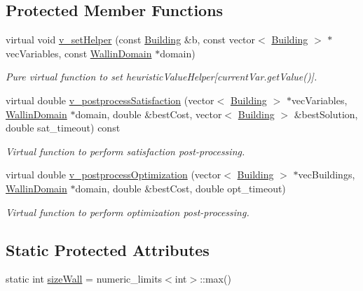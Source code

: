\subsection*{Protected Member Functions}
\begin{DoxyCompactItemize}
\item 
virtual void \hyperlink{classghost_1_1WallinObjective_abc0f66adeebca9f9787a4ae348219fb8}{v\-\_\-set\-Helper} (const \hyperlink{classghost_1_1Building}{Building} \&b, const vector$<$ \hyperlink{classghost_1_1Building}{Building} $>$ $\ast$vec\-Variables, const \hyperlink{classghost_1_1WallinDomain}{Wallin\-Domain} $\ast$domain)
\begin{DoxyCompactList}\small\item\em Pure virtual function to set heuristic\-Value\-Helper\mbox{[}current\-Var.\-get\-Value()\mbox{]}. \end{DoxyCompactList}\item 
virtual double \hyperlink{classghost_1_1WallinObjective_abf3e5873e61f7878e9c31a45642d1544}{v\-\_\-postprocess\-Satisfaction} (vector$<$ \hyperlink{classghost_1_1Building}{Building} $>$ $\ast$vec\-Variables, \hyperlink{classghost_1_1WallinDomain}{Wallin\-Domain} $\ast$domain, double \&best\-Cost, vector$<$ \hyperlink{classghost_1_1Building}{Building} $>$ \&best\-Solution, double sat\-\_\-timeout) const 
\begin{DoxyCompactList}\small\item\em Virtual function to perform satisfaction post-\/processing. \end{DoxyCompactList}\item 
virtual double \hyperlink{classghost_1_1WallinObjective_a646246ffb22f8b915f2d24c9439426fd}{v\-\_\-postprocess\-Optimization} (vector$<$ \hyperlink{classghost_1_1Building}{Building} $>$ $\ast$vec\-Buildings, \hyperlink{classghost_1_1WallinDomain}{Wallin\-Domain} $\ast$domain, double \&best\-Cost, double opt\-\_\-timeout)
\begin{DoxyCompactList}\small\item\em Virtual function to perform optimization post-\/processing. \end{DoxyCompactList}\end{DoxyCompactItemize}
\subsection*{Static Protected Attributes}
\begin{DoxyCompactItemize}
\item 
static int \hyperlink{classghost_1_1WallinObjective_aef1d7697ca6b29eccb4f3c62f42316ed}{size\-Wall} = numeric\-\_\-limits$<$int$>$\-::max()
\end{DoxyCompactItemize}
